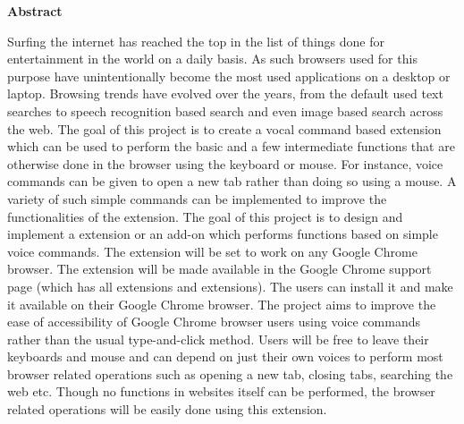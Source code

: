 \documentclass[12pt]{report} %
\begin{document}
	
	
	
	\thispagestyle{empty}
	\begin{center}
		\begin{minipage}{\linewidth}
			\vspace{3cm}
			{\centering \bf{Abstract}\par}
			\vspace{0.5cm}
			Surfing the internet has reached the top in the list of things done for entertainment in the world on a daily basis. As such browsers used for this purpose have unintentionally become the most used applications on a desktop or laptop. 
			Browsing trends have evolved over the years, from the default used text searches to speech recognition based search and even image based search across the web. 
			The goal of this project is to create a vocal command based extension which can be used to perform the basic and a few intermediate functions that are otherwise done in the browser using the keyboard or mouse. 
			For instance, voice commands can be given to open a new tab rather than doing so using a mouse. A variety of such simple commands can be implemented to improve the functionalities of the extension.
			The goal of this project is to design and implement a extension or an add-on which performs functions based on simple voice commands. The extension will be set to work on any Google Chrome browser. The extension will be made available in the Google Chrome support page (which has all extensions and extensions). 
			The users can install it and make it available on their Google Chrome browser.  
			The project aims to improve the ease of accessibility of Google Chrome browser users using voice commands rather than the usual type-and-click method. 
			Users will be free to leave their keyboards and mouse and can depend on just their own voices to perform most browser related operations such as opening a new tab, closing tabs, searching the web etc. Though no functions in websites itself can be performed, the browser related operations will be easily done using this extension. 
		\end{minipage}
	\end{center}
	\clearpage
	
\end{document}
